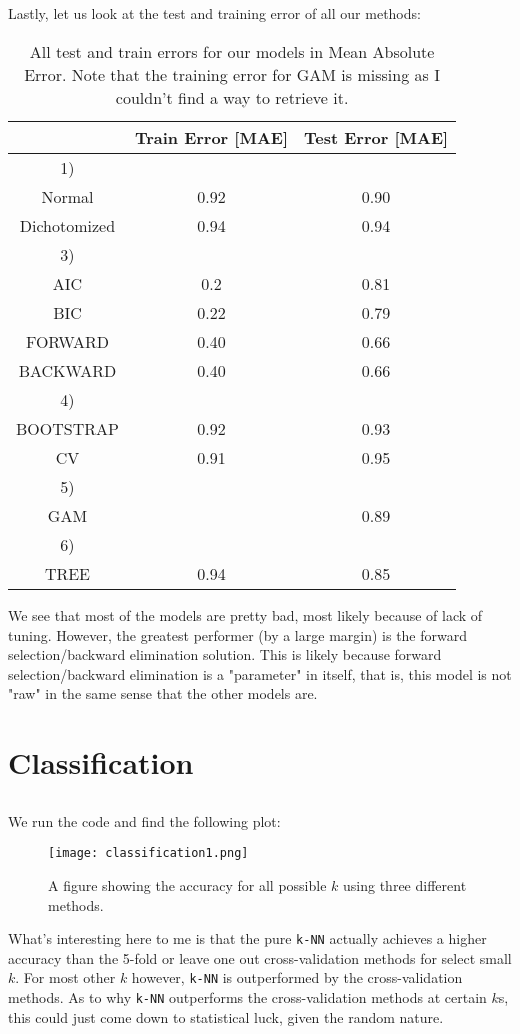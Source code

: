 \documentclass{article}
\begin{document}
\subsection{}
Lastly, let us look at the test and training error of all our methods:
\begin{table}[ht!]
    \centering
    \begin{tabular}{c|c|c}
         & Train Error [MAE] & Test Error [MAE]  \\
         \hline
         1)&  \\
         Normal & 0.92 & 0.90 \\
         Dichotomized& 0.94& 0.94 \\ 
         3)& \\
         AIC&  0.2& 0.81 \\
         BIC& 0.22&  0.79\\
         FORWARD& 0.40& 0.66 \\
         BACKWARD& 0.40& 0.66 \\
         4)& \\
         BOOTSTRAP& 0.92& 0.93 \\
         CV& 0.91& 0.95 \\
         5)& \\
         GAM& & 0.89 \\
         6)& \\
         TREE& 0.94& 0.85
    \end{tabular}
    \caption{All test and train errors for our models in Mean Absolute Error. \newline
    Note that the training error for GAM is missing as I couldn't find a way to retrieve it.}
    \label{tabErrs}
\end{table} \newline
We see that most of the models are pretty bad, most likely because of lack of tuning. However, the greatest performer (by a large margin) is the forward selection/backward elimination solution. This is likely because forward selection/backward elimination is a "parameter" in itself, that is, this model is not "raw" in the same sense that the other models are.
\newpage
\section{Classification}
\subsection{}
We run the code and find the following plot:
\begin{figure}[ht!]
    \centering
    \texttt{[image: classification1.png]}
    \caption{A figure showing the accuracy for all possible $k$ using three different methods.}
    \label{figC1}
\end{figure} \newline
What's interesting here to me is that the pure \texttt{k-NN} actually achieves a higher accuracy than the 5-fold or leave one out cross-validation methods for select small $k$. For most other $k$ however, \texttt{k-NN} is outperformed by the cross-validation methods. As to why \texttt{k-NN} outperforms the cross-validation methods at certain $k$s, this could just come down to statistical luck, given the random nature.
\newpage
\end{document}
